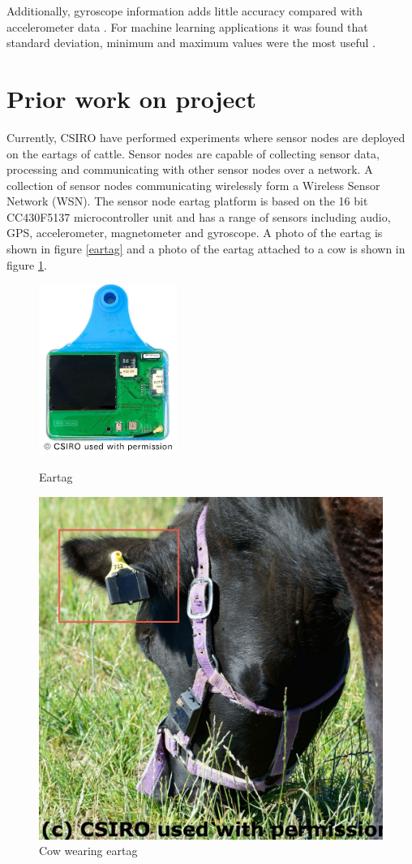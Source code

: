 Additionally, gyroscope information adds little accuracy compared with accelerometer data \cite{Gerencser2013}. For machine learning applications it was found that standard deviation, minimum and maximum values were the most useful \cite{Gerencser2013}. 


\section{Prior work on project}
\label{sec:prior work}
Currently, CSIRO have performed experiments where sensor nodes are deployed on the eartags of cattle. Sensor nodes are capable of collecting sensor data, processing and communicating with other sensor nodes over a network. A collection of sensor nodes communicating wirelessly form a Wireless Sensor Network (WSN). The sensor node eartag platform is based on the 16 bit CC430F5137 microcontroller unit and has a range of sensors including audio, GPS, accelerometer, magnetometer and gyroscope. A photo of the eartag is shown in figure \ref{eartag} and a photo of the eartag attached to a cow is shown in figure \ref{cow}.


\begin{figure}[ht!]
\centering
\begin{minipage}{.5\textwidth}
  \centering
  \includegraphics[width=0.4\textwidth]{images/eartag.png}
  \caption{Eartag}
  \label{eartag}
\end{minipage}%
\begin{minipage}{.5\textwidth}
  \centering
  \includegraphics[width=.5\textwidth]{images/cow.jpg}
  \caption{Cow wearing eartag}
  \label{cow}
\end{minipage}
\end{figure}


